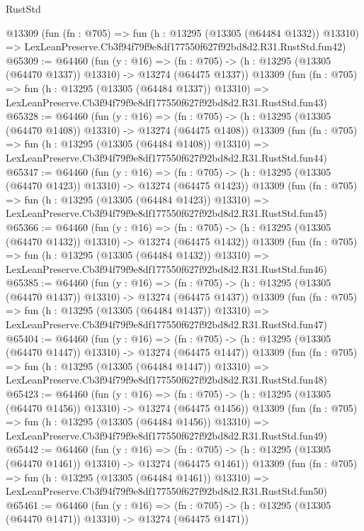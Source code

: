 \begin{lexlean}{RustStd}
\begin{coremodule}
    @13309
    (fun (fn : @705) =>
    fun (h : @13295 (@13305 (@64484 @1332)) @13310) =>
    LexLeanPreserve.Cb3f94f79f9e8df177550f627f92bd8d2.R31.RustStd.fun42)
@65309 := @64460
    (fun (y : @16) =>
    (fn : @705) -> (h : @13295 (@13305 (@64470 @1337)) @13310) -> @13274 (@64475 @1337))
    @13309
    (fun (fn : @705) =>
    fun (h : @13295 (@13305 (@64484 @1337)) @13310) =>
    LexLeanPreserve.Cb3f94f79f9e8df177550f627f92bd8d2.R31.RustStd.fun43)
@65328 := @64460
    (fun (y : @16) =>
    (fn : @705) -> (h : @13295 (@13305 (@64470 @1408)) @13310) -> @13274 (@64475 @1408))
    @13309
    (fun (fn : @705) =>
    fun (h : @13295 (@13305 (@64484 @1408)) @13310) =>
    LexLeanPreserve.Cb3f94f79f9e8df177550f627f92bd8d2.R31.RustStd.fun44)
@65347 := @64460
    (fun (y : @16) =>
    (fn : @705) -> (h : @13295 (@13305 (@64470 @1423)) @13310) -> @13274 (@64475 @1423))
    @13309
    (fun (fn : @705) =>
    fun (h : @13295 (@13305 (@64484 @1423)) @13310) =>
    LexLeanPreserve.Cb3f94f79f9e8df177550f627f92bd8d2.R31.RustStd.fun45)
@65366 := @64460
    (fun (y : @16) =>
    (fn : @705) -> (h : @13295 (@13305 (@64470 @1432)) @13310) -> @13274 (@64475 @1432))
    @13309
    (fun (fn : @705) =>
    fun (h : @13295 (@13305 (@64484 @1432)) @13310) =>
    LexLeanPreserve.Cb3f94f79f9e8df177550f627f92bd8d2.R31.RustStd.fun46)
@65385 := @64460
    (fun (y : @16) =>
    (fn : @705) -> (h : @13295 (@13305 (@64470 @1437)) @13310) -> @13274 (@64475 @1437))
    @13309
    (fun (fn : @705) =>
    fun (h : @13295 (@13305 (@64484 @1437)) @13310) =>
    LexLeanPreserve.Cb3f94f79f9e8df177550f627f92bd8d2.R31.RustStd.fun47)
@65404 := @64460
    (fun (y : @16) =>
    (fn : @705) -> (h : @13295 (@13305 (@64470 @1447)) @13310) -> @13274 (@64475 @1447))
    @13309
    (fun (fn : @705) =>
    fun (h : @13295 (@13305 (@64484 @1447)) @13310) =>
    LexLeanPreserve.Cb3f94f79f9e8df177550f627f92bd8d2.R31.RustStd.fun48)
@65423 := @64460
    (fun (y : @16) =>
    (fn : @705) -> (h : @13295 (@13305 (@64470 @1456)) @13310) -> @13274 (@64475 @1456))
    @13309
    (fun (fn : @705) =>
    fun (h : @13295 (@13305 (@64484 @1456)) @13310) =>
    LexLeanPreserve.Cb3f94f79f9e8df177550f627f92bd8d2.R31.RustStd.fun49)
@65442 := @64460
    (fun (y : @16) =>
    (fn : @705) -> (h : @13295 (@13305 (@64470 @1461)) @13310) -> @13274 (@64475 @1461))
    @13309
    (fun (fn : @705) =>
    fun (h : @13295 (@13305 (@64484 @1461)) @13310) =>
    LexLeanPreserve.Cb3f94f79f9e8df177550f627f92bd8d2.R31.RustStd.fun50)
@65461 := @64460
    (fun (y : @16) =>
    (fn : @705) -> (h : @13295 (@13305 (@64470 @1471)) @13310) -> @13274 (@64475 @1471))

\end{coremodule}
\end{lexlean}
